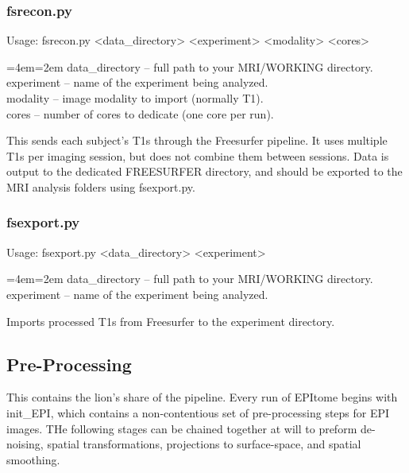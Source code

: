 \documentclass[final,titlepage,letterpaper,oneside,12pt]{article}
\renewcommand{\texttt}[2][BrickRed]{\textcolor{#1}{\ttfamily #2}}%
\newenvironment{blockquote}{%
  \par%
  \medskip
  \leftskip=4em\rightskip=2em%
  \noindent\ignorespaces}{%
  \par\medskip}
\begin{document}
\subsubsection{fsrecon.py}
Usage: \texttt{fsrecon.py <data\_directory> <experiment> <modality> <cores>} \

\begin{blockquote}
data\_directory -- full path to your MRI/WORKING directory. \\
experiment -- name of the experiment being analyzed. \\
modality -- image modality to import (normally T1). \\
cores -- number of cores to dedicate (one core per run). \
\end{blockquote}

\noindent This sends each subject's T1s through the Freesurfer pipeline. It uses multiple T1s per imaging session, but does not combine them between sessions. Data is output to the dedicated FREESURFER directory, and should be exported to the MRI analysis folders using \texttt{fsexport.py}.

\subsubsection{fsexport.py}
Usage: \texttt{fsexport.py <data\_directory> <experiment>}

\begin{blockquote}
data\_directory -- full path to your MRI/WORKING directory. \\
experiment -- name of the experiment being analyzed. \
\end{blockquote}

\noindent Imports processed T1s from Freesurfer to the experiment directory.

\subsection{Pre-Processing}

This contains the lion's share of the pipeline. Every run of EPItome begins with \texttt{init\_EPI}, which contains a non-contentious set of pre-processing steps for EPI images. THe following stages can be chained together at will to preform de-noising, spatial transformations, projections to surface-space, and spatial smoothing.
\end{document}
